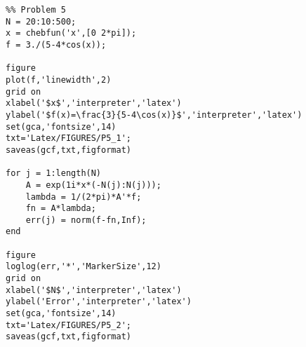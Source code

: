 \begin{verbatim}
%% Problem 5
N = 20:10:500;
x = chebfun('x',[0 2*pi]);
f = 3./(5-4*cos(x));

figure
plot(f,'linewidth',2)
grid on
xlabel('$x$','interpreter','latex')
ylabel('$f(x)=\frac{3}{5-4\cos(x)}$','interpreter','latex')
set(gca,'fontsize',14)
txt='Latex/FIGURES/P5_1';
saveas(gcf,txt,figformat)

for j = 1:length(N)
    A = exp(1i*x*(-N(j):N(j)));
    lambda = 1/(2*pi)*A'*f;
    fn = A*lambda;
    err(j) = norm(f-fn,Inf);
end

figure
loglog(err,'*','MarkerSize',12)
grid on
xlabel('$N$','interpreter','latex')
ylabel('Error','interpreter','latex')
set(gca,'fontsize',14)
txt='Latex/FIGURES/P5_2';
saveas(gcf,txt,figformat)
\end{verbatim}
